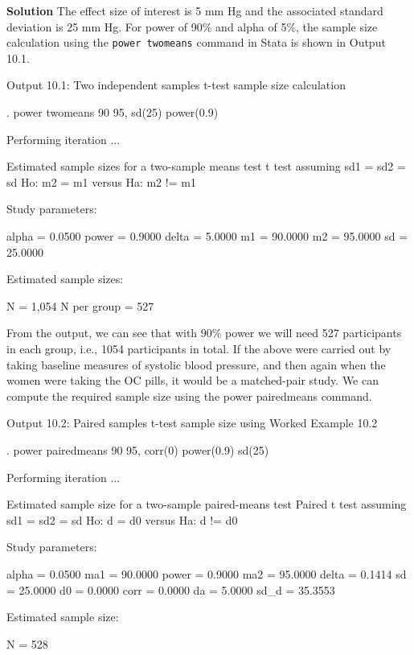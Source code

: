 \documentclass[
]{memoir}
\newenvironment{Shaded}{\begin{snugshade}}{\end{snugshade}}
\newcommand{\NormalTok}[1]{#1}
\begin{document}
\textbf{Solution}
The effect size of interest is 5 mm Hg and the associated standard deviation is 25 mm Hg. For power of 90\% and alpha of 5\%, the sample size calculation using the \texttt{power\ twomeans} command in Stata is shown in Output 10.1.

Output 10.1: Two independent samples t-test sample size calculation

\begin{Shaded}
\begin{Highlighting}[]
\NormalTok{. power twomeans 90 95, sd(25) power(0.9)}

\NormalTok{Performing iteration ...}

\NormalTok{Estimated sample sizes for a two{-}sample means test}
\NormalTok{t test assuming sd1 = sd2 = sd}
\NormalTok{Ho: m2 = m1 versus  Ha: m2 != m1}

\NormalTok{Study parameters:}

\NormalTok{        alpha =    0.0500}
\NormalTok{        power =    0.9000}
\NormalTok{        delta =    5.0000}
\NormalTok{           m1 =   90.0000}
\NormalTok{           m2 =   95.0000}
\NormalTok{           sd =   25.0000}

\NormalTok{Estimated sample sizes:}

\NormalTok{            N =     1,054}
\NormalTok{  N per group =       527}
\end{Highlighting}
\end{Shaded}

From the output, we can see that with 90\% power we will need 527 participants in each group, i.e., 1054 participants in total.
If the above were carried out by taking baseline measures of systolic blood pressure, and then again when the women were taking the OC pills, it would be a matched-pair study. We can compute the required sample size using the power pairedmeans command.

Output 10.2: Paired samples t-test sample size using Worked Example 10.2

\begin{Shaded}
\begin{Highlighting}[]
\NormalTok{. power pairedmeans 90 95, corr(0) power(0.9) sd(25)}

\NormalTok{Performing iteration ...}

\NormalTok{Estimated sample size for a two{-}sample paired{-}means test}
\NormalTok{Paired t test assuming sd1 = sd2 = sd}
\NormalTok{Ho: d = d0  versus  Ha: d != d0}

\NormalTok{Study parameters:}

\NormalTok{        alpha =    0.0500          ma1 =   90.0000}
\NormalTok{        power =    0.9000          ma2 =   95.0000}
\NormalTok{        delta =    0.1414           sd =   25.0000}
\NormalTok{           d0 =    0.0000         corr =    0.0000}
\NormalTok{           da =    5.0000}
\NormalTok{         sd\_d =   35.3553}

\NormalTok{Estimated sample size:}

\NormalTok{            N =       528}
\end{Highlighting}
\end{Shaded}
\end{document}
